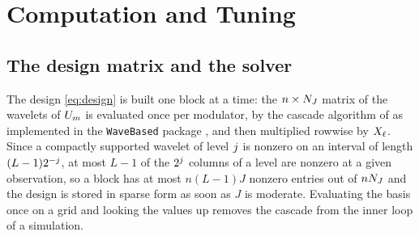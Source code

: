 \section{Computation and Tuning}
\label{sec:computation}

\subsection{The design matrix and the solver}
\label{sec:solver}

The design \eqref{eq:design} is built one block at a time: the $n \times N_{J}$
matrix of the wavelets of $U_{m}$ is evaluated once per modulator, by the
cascade algorithm of \citet{Daubechies-Lagarias-1991} as implemented in
the \texttt{WaveBased} package \citep{Montoril-WaveBased-2026}, and then multiplied
rowwise by $X_{\ell}$. Since a compactly supported wavelet of level $j$ is
nonzero on an interval of length $(L-1)2^{-j}$, at most $L-1$ of the
$2^{j}$ columns of a level are nonzero at a given observation, so a block
has at most $n(L-1)J$ nonzero entries out of $nN_{J}$ and the design is stored in
sparse form as soon as $J$ is moderate. Evaluating the basis once on a grid and
looking the values up removes the cascade from the inner loop of a
simulation.

